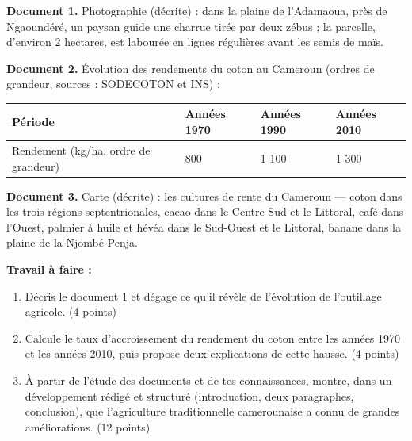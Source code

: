 \documentclass[11pt]{article}
\begin{document}
\begin{exercice}
\textbf{Document 1.} Photographie (décrite) : dans la plaine de l'Adamaoua, près de Ngaoundéré, un paysan guide une charrue tirée par deux zébus ; la parcelle, d'environ 2 hectares, est labourée en lignes régulières avant les semis de maïs.

\textbf{Document 2.} Évolution des rendements du coton au Cameroun (ordres de grandeur, sources : SODECOTON et INS) :

\begin{center}
\begin{tabularx}{\linewidth}{|l|X|X|X|}\hline
\rowcolor{popblueL} Période & Années 1970 & Années 1990 & Années 2010 \\ \hline
Rendement (kg/ha, ordre de grandeur) & 800 & 1 100 & 1 300 \\ \hline
\end{tabularx}
\end{center}

\textbf{Document 3.} Carte (décrite) : les cultures de rente du Cameroun — coton dans les trois régions septentrionales, cacao dans le Centre-Sud et le Littoral, café dans l'Ouest, palmier à huile et hévéa dans le Sud-Ouest et le Littoral, banane dans la plaine de la Njombé-Penja.

\textbf{Travail à faire :}
\begin{enumerate}
\item Décris le document 1 et dégage ce qu'il révèle de l'évolution de l'outillage agricole. (4 points)
\item Calcule le taux d'accroissement du rendement du coton entre les années 1970 et les années 2010, puis propose deux explications de cette hausse. (4 points)
\item À partir de l'étude des documents et de tes connaissances, montre, dans un développement rédigé et structuré (introduction, deux paragraphes, conclusion), que l'agriculture traditionnelle camerounaise a connu de grandes améliorations. (12 points)
\end{enumerate}
\end{exercice}
\end{document}
